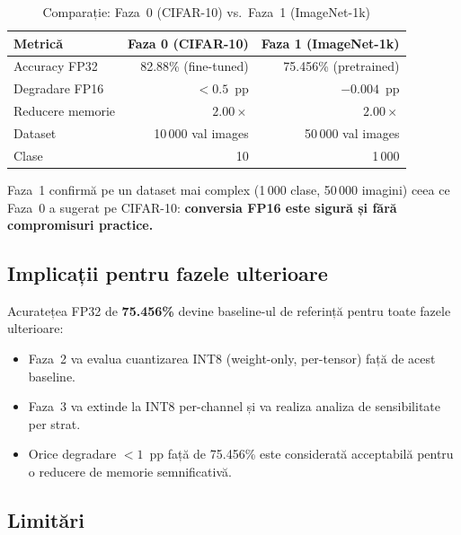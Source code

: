 \documentclass[12pt,a4paper]{article}
\begin{document}
\begin{table}[H]
  \centering
  \caption{Comparație: Faza~0 (CIFAR-10) vs.\ Faza~1 (ImageNet-1k)}
  \begin{tabular}{lrr}
    \toprule
    \textbf{Metrică} & \textbf{Faza 0 (CIFAR-10)} & \textbf{Faza 1 (ImageNet-1k)} \\
    \midrule
    Accuracy FP32         & 82.88\% (fine-tuned)   & 75.456\% (pretrained)  \\
    Degradare FP16        & $<0.5$~pp              & $-0.004$~pp            \\
    Reducere memorie      & $2.00\times$           & $2.00\times$           \\
    Dataset               & 10\,000 val images     & 50\,000 val images     \\
    Clase                 & 10                     & 1\,000                 \\
    \bottomrule
  \end{tabular}
  \label{tab:fp16_vs_prelim}
\end{table}

Faza~1 confirmă pe un dataset mai complex (1\,000 clase, 50\,000 imagini)
ceea ce Faza~0 a sugerat pe CIFAR-10: \textbf{conversia FP16 este sigură
și fără compromisuri practice.}

\subsection{Implicații pentru fazele ulterioare}

Acuratețea FP32 de \textbf{75.456\%} devine baseline-ul de referință pentru
toate fazele ulterioare:
\begin{itemize}
  \item Faza~2 va evalua cuantizarea INT8 (weight-only, per-tensor) față de
    acest baseline.
  \item Faza~3 va extinde la INT8 per-channel și va realiza analiza de
    sensibilitate per strat.
  \item Orice degradare $<1$~pp față de 75.456\% este considerată acceptabilă
    pentru o reducere de memorie semnificativă.
\end{itemize}

\subsection{Limitări}
\end{document}
